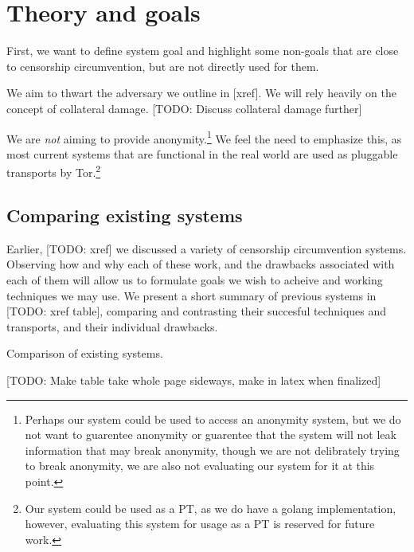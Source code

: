 \documentclass[12pt]{report}
\begin{document}
\section{Theory and goals}

First, we want to define system goal and highlight some non-goals that are close to censorship circumvention, but are not directly used for them.

We aim to thwart the adversary we outline in [xref]. We will rely heavily on the concept of collateral damage. [TODO: Discuss collateral damage further]

We are \emph{not} aiming to provide anonymity.\footnote{Perhaps our system could be used to access an anonymity system, but we do not want to guarentee anonymity or guarentee that the system will not leak information that may break anonymity, though we are not delibrately trying to break anonymity, we are also not evaluating our system for it at this point.} We feel the need to emphasize this, as most current systems that are functional in the real world are used as pluggable transports by Tor.\footnote{Our system could be used as a PT, as we do have a golang implementation, however, evaluating this system for usage as a PT is reserved for future work.}

\subsection{Comparing existing systems}

Earlier, [TODO: xref] we discussed a variety of censorship circumvention systems. Observing how and why each of these work, and the drawbacks associated with each of them will allow us to formulate goals we wish to acheive and working techniques we may use. We present a short summary of previous systems in [TODO: xref table], comparing and contrasting their succesful techniques and transports, and their individual drawbacks.

\begin{table}
\caption{Comparison of existing systems.}
\begin{center}
[TODO: Make table take whole page sideways, make in latex when finalized]
\end{center}
\end{table}
\end{document}
